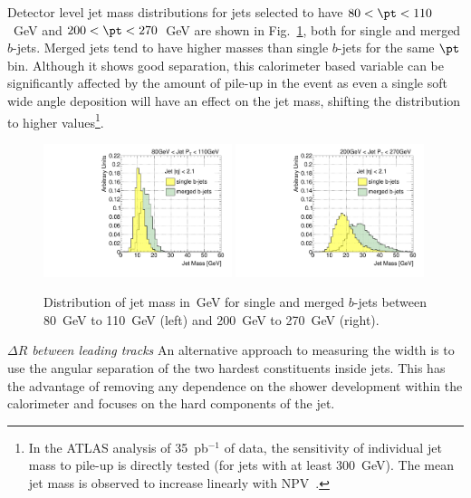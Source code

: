 Detector level jet mass distributions for jets selected to have $80 < \pt < 110$~GeV and $200 < \pt < 270$~GeV are shown in Fig.~\ref{fig:masssinglemerged}, both for single and merged $b$-jets. Merged jets tend to have higher masses than single $b$-jets for the same $\pt$ bin.  
Although it shows good separation, this calorimeter based variable %
can be significantly affected by the amount of pile-up in the event as even a single soft wide angle deposition will have an effect on the jet mass, shifting the distribution to higher values\footnote{In the ATLAS analysis of 35~pb$^{-1}$ of data, the sensitivity of individual jet mass to pile-up is directly tested (for jets with at least 300~GeV). The mean jet mass is observed to increase linearly with NPV~\cite{ATLAS-CONF-2011-073}.}. %

\begin{figure}[tp]
\centering
\includegraphics[width=0.49\textwidth]{FIGS/VarsSingleMerged/JetMass080.pdf}
\includegraphics[width=0.49\textwidth]{FIGS/VarsSingleMerged/JetMass200.pdf}
\caption{Distribution of jet mass in~GeV for single and merged $b$-jets between 80~GeV to 110~GeV (left) and 200~GeV to 270~GeV (right).}
\label{fig:masssinglemerged}
\end{figure}


{ \em $\Delta R$ between leading tracks}  An alternative approach to measuring the width is to use the angular separation of the two hardest constituents inside jets. This has the advantage of removing any dependence on the shower development within the calorimeter and focuses on the hard components of the jet. 

